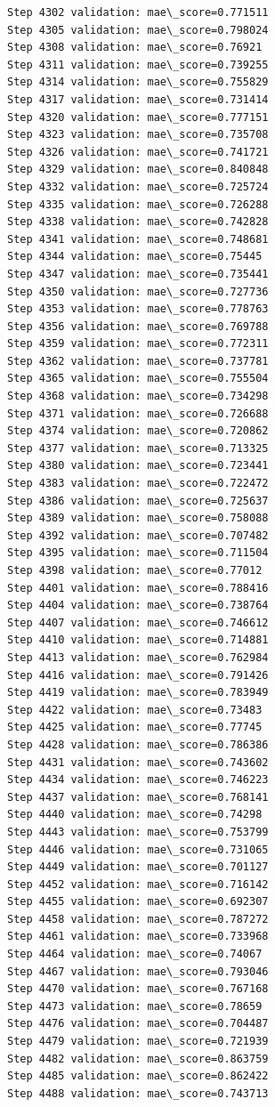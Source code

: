 \documentclass[11pt]{article}
\begin{document}
\begin{Verbatim}[commandchars=\\\{\}]
Step 4302 validation: mae\_score=0.771511
Step 4305 validation: mae\_score=0.798024
Step 4308 validation: mae\_score=0.76921
Step 4311 validation: mae\_score=0.739255
Step 4314 validation: mae\_score=0.755829
Step 4317 validation: mae\_score=0.731414
Step 4320 validation: mae\_score=0.777151
Step 4323 validation: mae\_score=0.735708
Step 4326 validation: mae\_score=0.741721
Step 4329 validation: mae\_score=0.840848
Step 4332 validation: mae\_score=0.725724
Step 4335 validation: mae\_score=0.726288
Step 4338 validation: mae\_score=0.742828
Step 4341 validation: mae\_score=0.748681
Step 4344 validation: mae\_score=0.75445
Step 4347 validation: mae\_score=0.735441
Step 4350 validation: mae\_score=0.727736
Step 4353 validation: mae\_score=0.778763
Step 4356 validation: mae\_score=0.769788
Step 4359 validation: mae\_score=0.772311
Step 4362 validation: mae\_score=0.737781
Step 4365 validation: mae\_score=0.755504
Step 4368 validation: mae\_score=0.734298
Step 4371 validation: mae\_score=0.726688
Step 4374 validation: mae\_score=0.720862
Step 4377 validation: mae\_score=0.713325
Step 4380 validation: mae\_score=0.723441
Step 4383 validation: mae\_score=0.722472
Step 4386 validation: mae\_score=0.725637
Step 4389 validation: mae\_score=0.758088
Step 4392 validation: mae\_score=0.707482
Step 4395 validation: mae\_score=0.711504
Step 4398 validation: mae\_score=0.77012
Step 4401 validation: mae\_score=0.788416
Step 4404 validation: mae\_score=0.738764
Step 4407 validation: mae\_score=0.746612
Step 4410 validation: mae\_score=0.714881
Step 4413 validation: mae\_score=0.762984
Step 4416 validation: mae\_score=0.791426
Step 4419 validation: mae\_score=0.783949
Step 4422 validation: mae\_score=0.73483
Step 4425 validation: mae\_score=0.77745
Step 4428 validation: mae\_score=0.786386
Step 4431 validation: mae\_score=0.743602
Step 4434 validation: mae\_score=0.746223
Step 4437 validation: mae\_score=0.768141
Step 4440 validation: mae\_score=0.74298
Step 4443 validation: mae\_score=0.753799
Step 4446 validation: mae\_score=0.731065
Step 4449 validation: mae\_score=0.701127
Step 4452 validation: mae\_score=0.716142
Step 4455 validation: mae\_score=0.692307
Step 4458 validation: mae\_score=0.787272
Step 4461 validation: mae\_score=0.733968
Step 4464 validation: mae\_score=0.74067
Step 4467 validation: mae\_score=0.793046
Step 4470 validation: mae\_score=0.767168
Step 4473 validation: mae\_score=0.78659
Step 4476 validation: mae\_score=0.704487
Step 4479 validation: mae\_score=0.721939
Step 4482 validation: mae\_score=0.863759
Step 4485 validation: mae\_score=0.862422
Step 4488 validation: mae\_score=0.743713

\end{Verbatim}
\end{document}
